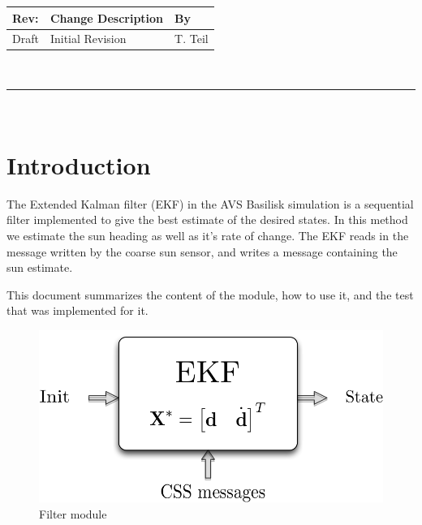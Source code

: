 \documentclass[]{BasiliskReportMemo}
\begin{document}
\makeCover



%
%
\pagestyle{empty}
{\renewcommand{\arraystretch}{2}
\noindent
\begin{longtable}{|p{0.5in}|p{4.5in}|p{1.14in}|}
\hline
{\bfseries Rev}: & {\bfseries Change Description} & {\bfseries By} \\
\hline
Draft & Initial Revision & T. Teil \\
\hline

\end{longtable}
}

\newpage
\setcounter{page}{1}
\pagestyle{fancy}

\tableofcontents
~\\ \hrule ~\\


\section{Introduction}
The Extended Kalman filter (EKF) in the AVS Basilisk simulation is a sequential
filter implemented to give the best estimate of the desired states.
In this method we estimate the sun heading as well as it's rate of change.
The EKF reads in the message written by the coarse sun sensor, and writes a message 
containing the sun estimate. 

This document summarizes the content of the module, how to use it, and the test that 
was implemented for it.

\begin{figure}[h]
\centering
            \includegraphics[height=0.3\textwidth,keepaspectratio]{Figures/SchematicEKF.png}
\caption{Filter module}
\end{figure}
\end{document}

